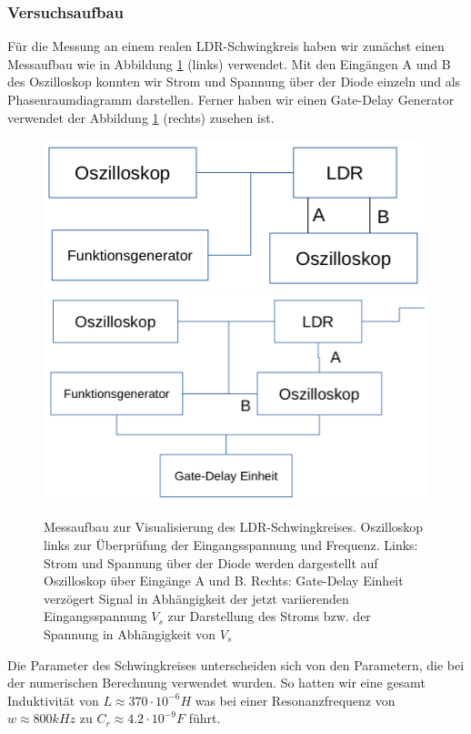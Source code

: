 \documentclass[11,5pt, twoside]{article}
\begin{document}
\subsubsection{ Versuchsaufbau}
Für die Messung an einem realen LDR-Schwingkreis haben wir zunächst einen Messaufbau wie in Abbildung \ref{fig:ldr-aufbau1} (links) verwendet. Mit den Eingängen A und B des Oszilloskop konnten wir Strom und Spannung über der Diode einzeln und als Phasenraumdiagramm darstellen. Ferner haben wir einen Gate-Delay Generator verwendet der Abbildung \ref{fig:ldr-aufbau1} (rechts) zusehen ist.
\begin{figure}[!htbp]
\includegraphics[scale=0.4]{aufbau1}
\includegraphics[scale=0.38]{aufbau2}
\caption{Messaufbau zur Visualisierung des LDR-Schwingkreises. Oszilloskop links zur Überprüfung der Eingangsspannung und Frequenz. Links: Strom und Spannung über der Diode werden dargestellt auf Oszilloskop über Eingänge A und B. Rechts: Gate-Delay Einheit verzögert Signal in Abhängigkeit der jetzt variierenden Eingangsspannung $V_s$ zur Darstellung des Stroms bzw. der Spannung in Abhängigkeit von $V_s$ }
\label{fig:ldr-aufbau1}
\end{figure}
Die Parameter des Schwingkreises unterscheiden sich von den Parametern, die bei der numerischen Berechnung verwendet wurden. So hatten wir eine gesamt Induktivität von $L\approx370\cdot10^{-6}H$ was bei einer Resonanzfrequenz von $w\approx800kHz$ zu $C_r\approx4.2\cdot10^{-9}F$ führt.
\end{document}
